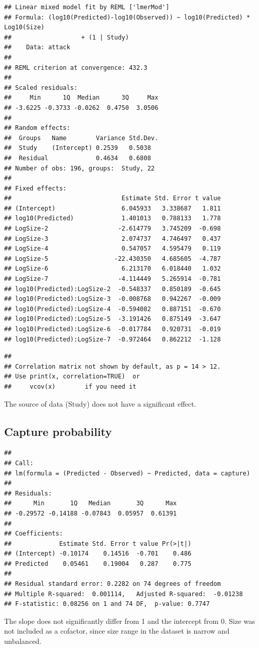 \documentclass[utf8, 12 pt]{frontiers_suppmat}
\begin{document}
\begin{verbatim}
## Linear mixed model fit by REML ['lmerMod']
## Formula: (log10(Predicted)-log10(Observed)) ~ log10(Predicted) * Log10(Size)
##                   + (1 | Study)
##    Data: attack
## 
## REML criterion at convergence: 432.3
## 
## Scaled residuals: 
##     Min      1Q  Median      3Q     Max 
## -3.6225 -0.3733 -0.0262  0.4750  3.0506 
## 
## Random effects:
##  Groups   Name        Variance Std.Dev.
##  Study    (Intercept) 0.2539   0.5038  
##  Residual             0.4634   0.6808  
## Number of obs: 196, groups:  Study, 22
## 
## Fixed effects:
##                              Estimate Std. Error t value
## (Intercept)                  6.045933   3.338687   1.811
## log10(Predicted)             1.401013   0.788133   1.778
## LogSize-2                   -2.614779   3.745209  -0.698
## LogSize-3                    2.074737   4.746497   0.437
## LogSize-4                    0.547057   4.595479   0.119
## LogSize-5                  -22.430350   4.685605  -4.787
## LogSize-6                    6.213170   6.018440   1.032
## LogSize-7                   -4.114449   5.265914  -0.781
## log10(Predicted):LogSize-2  -0.548337   0.850189  -0.645
## log10(Predicted):LogSize-3  -0.008768   0.942267  -0.009
## log10(Predicted):LogSize-4  -0.594082   0.887151  -0.670
## log10(Predicted):LogSize-5  -3.191426   0.875149  -3.647
## log10(Predicted):LogSize-6  -0.017784   0.920731  -0.019
## log10(Predicted):LogSize-7  -0.972464   0.862212  -1.128
\end{verbatim}

\begin{verbatim}
## 
## Correlation matrix not shown by default, as p = 14 > 12.
## Use print(x, correlation=TRUE)  or
##     vcov(x)        if you need it
\end{verbatim}
The source of data (Study) does not have a significant effect.
\par
\vspace{0.3 cm}

\hypertarget{capture-probability}{%
\subsection{Capture probability}\label{capture-probability}}

\begin{verbatim}
## 
## Call:
## lm(formula = (Predicted - Observed) ~ Predicted, data = capture)
## 
## Residuals:
##      Min       1Q   Median       3Q      Max 
## -0.29572 -0.14188 -0.07843  0.05957  0.61391 
## 
## Coefficients:
##             Estimate Std. Error t value Pr(>|t|)
## (Intercept) -0.10174    0.14516  -0.701    0.486
## Predicted    0.05461    0.19004   0.287    0.775
## 
## Residual standard error: 0.2282 on 74 degrees of freedom
## Multiple R-squared:  0.001114,   Adjusted R-squared:  -0.01238 
## F-statistic: 0.08256 on 1 and 74 DF,  p-value: 0.7747
\end{verbatim}
The slope does not significantly differ from 1 and the intercept from 0.
Size was not included as a cofactor, since size range in the dataset is
narrow and unbalanced.
\par
\vspace{0.3 cm}
\end{document}
